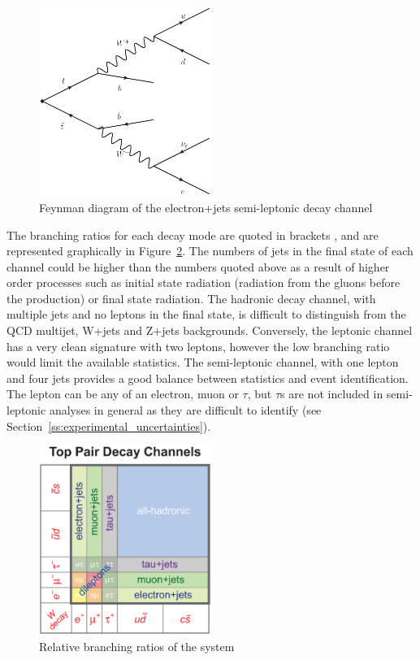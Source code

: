 \begin{figure}[hbtp]
   \centering
     \includegraphics[width=0.5\textwidth]{Chapters/02_Theory/Images/semileptonic_decay}\hfill
     \caption{Feynman diagram of the electron+jets semi-leptonic \ttbar decay channel}
     \label{fig:semileptonic_decay}
\end{figure}

The branching ratios for each decay mode are quoted in brackets \cite{Agashe:2014kda}, and are represented
graphically in Figure~\ref{fig:ttbar_branching_ratios}. The numbers of jets in the final state of each channel
could be higher than the numbers quoted above as a result of higher order processes such as initial state
radiation (radiation from the gluons before the \ttbar production) or final state radiation. The hadronic
decay channel, with multiple jets and no leptons in the final state, is difficult to distinguish from the QCD
multijet, W+jets and Z+jets backgrounds. Conversely, the leptonic channel has a very clean signature with two
leptons, however the low branching ratio would limit the available statistics. The semi-leptonic channel, with
one lepton and four jets provides a good balance between statistics and event identification. The lepton can
be any of an electron, muon or $\tau$, but $\tau$s are not included in semi-leptonic \tquark analyses in
general as they are difficult to identify (see Section~\ref{ss:experimental_uncertainties}).

\begin{figure}[hbtp]
   \centering
     \includegraphics[width=0.5\textwidth]{Chapters/02_Theory/Images/top_pair_decay_channels.eps}\hfill
     \caption{Relative branching ratios of the \ttbar system}
     \label{fig:ttbar_branching_ratios}
\end{figure}

